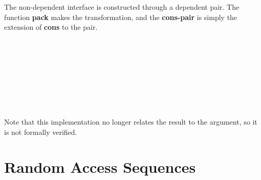 \documentclass[12pt,twoside,notitlepage]{report}
\begin{document}
The non-dependent interface is constructed through a dependent pair. The function \textbf{pack} makes the transformation, and the \textbf{cons-pair} is simply the extension of \textbf{cons} to the pair.\\

\begin{code}
\> \AgdaSymbol{:}  \AgdaSymbol{\{}\AgdaSymbol{\}} \AgdaSymbol{\{} \AgdaSymbol{:}  \AgdaSymbol{\}} \AgdaSymbol{\{} \AgdaSymbol{:}  \AgdaSymbol{\}}\<%
\\
\>[2]\<[10]%
\>[10]  \AgdaSymbol{:}   \<%
\\
\>[2]\<[10]%
\>[10]  \AgdaSymbol{:}    \<%
\\
\>[2]\<[10]%
\>[10] \AgdaSymbol{(}        \AgdaSymbol{\{}\AgdaSymbol{\}))}\<%
\\
\>[2]\<[10]%
\>[10] \AgdaSymbol{(}        \AgdaSymbol{\{}\AgdaSymbol{\}))}\<%
\\
\> \AgdaSymbol{\{}\AgdaSymbol{\}} \AgdaSymbol{\{}\AgdaSymbol{\}} \AgdaSymbol{\{}\AgdaSymbol{\}}  \AgdaSymbol{=}\<%
\\
\>[0]\<[2]%
\>[2]  \AgdaSymbol{(} \AgdaSymbol{\{} \AgdaSymbol{=} \AgdaSymbol{\}} \AgdaSymbol{\{} \AgdaSymbol{=} \AgdaSymbol{\}} \AgdaSymbol{)} \<%
\\
%
\end{code} 

Note that this implementation no longer relates the result to the argument, so it is not formally verified. 

\section{Random Access Sequences}
\end{document}
